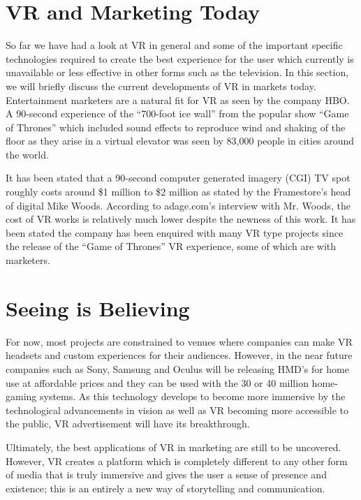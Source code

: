 \documentclass[11pt]{article} %
\begin{document}
\section{VR and Marketing Today}
So far we have had a look at VR in general and some of the important specific technologies required to create the best experience for the user which currently is unavailable or less effective in other forms such as the television. In this section, we will briefly discuss the current developments of VR in markets today. Entertainment marketers are a natural fit for VR as seen by the company HBO. A 90-second experience of the “700-foot ice wall” from the popular show “Game of Thrones” which included sound effects to reproduce wind and shaking of the floor as they arise in a virtual elevator was seen by 83,000 people in cities around the world. 
\par

It has been stated that a 90-second computer generated imagery (CGI) TV spot roughly costs around \$1 million to \$2 million as stated by the Framestore’s head of digital Mike Woods. According to adage.com’s interview with Mr. Woods, the cost of VR works is relatively much lower despite the newness of this work. It has been stated the company has been enquired with many VR type projects since the release of the “Game of Thrones” VR experience, some of which are with marketers. 
\par

\section{Seeing is Believing}
For now, most projects are constrained to venues where companies can make VR headsets and custom experiences for their audiences. However, in the near future companies such as Sony, Samsung and Oculus will be releasing HMD’s for home use at affordable prices and they can be used with the 30 or 40 million home-gaming systems. As this technology develops to become more immersive by the technological advancements in vision as well as VR becoming more accessible to the public, VR advertisement will have its breakthrough. 
\par

Ultimately, the best applications of VR in marketing are still to be uncovered. However, VR creates a platform which is completely different to any other form of media that is truly immersive and gives the user a sense of presence and existence; this is an entirely a new way of storytelling and communication. 
\end{document}
